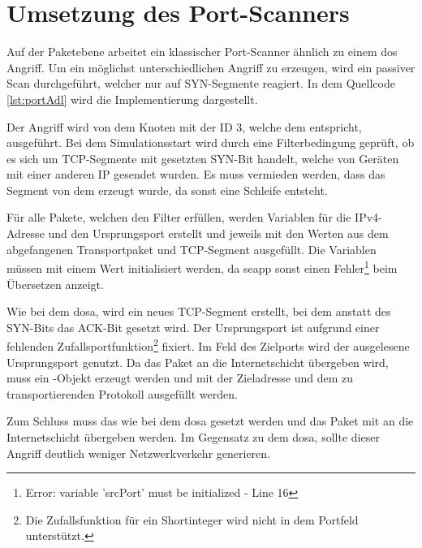 \section{Umsetzung des Port-Scanners}
\begin{program}[ht]
	}]{tucsnet/attacks/portPassive.adl}
	\caption[ACK-Scan]{Angriffsdefinition für den passiven ACK-Scan}
	\label{lst:portAdl}
\end{program}

Auf der Paketebene arbeitet ein klassischer Port-Scanner ähnlich zu einem \gls{dos} Angriff. Um ein möglichst unterschiedlichen Angriff zu erzeugen, wird ein passiver Scan durchgeführt, welcher nur auf SYN-Segmente reagiert. In dem Quellcode \ref{lst:portAdl} wird die Implementierung dargestellt. 

Der Angriff wird von dem Knoten mit der ID 3, welche dem  entspricht, ausgeführt. Bei dem Simulationsstart wird durch eine Filterbedingung geprüft, ob es sich um TCP-Segmente mit gesetzten SYN-Bit handelt, welche von Geräten mit einer anderen IP gesendet wurden. Es muss vermieden werden, dass das Segment von dem  erzeugt wurde, da sonst eine Schleife entsteht.

Für alle Pakete, welchen den Filter erfüllen, werden Variablen für die IPv4-Adresse und den Ursprungsport erstellt und jeweils mit den Werten aus dem abgefangenen Transportpaket und TCP-Segment ausgefüllt. Die Variablen müssen mit einem Wert initialisiert werden, da \gls{seapp} sonst einen Fehler\footnote{Error: variable 'srcPort' must be initialized - Line 16} beim Übersetzen anzeigt.

Wie bei dem \gls{dosa}, wird ein neues TCP-Segment erstellt, bei dem anstatt des SYN-Bits das ACK-Bit gesetzt wird. Der Ursprungsport ist aufgrund einer fehlenden Zufallsportfunktion\footnote{Die Zufallsfunktion für ein Shortinteger wird nicht in dem Portfeld unterstützt.} fixiert. Im Feld des Zielports wird der ausgelesene Ursprungsport genutzt. Da das Paket an die Internetschicht übergeben wird, muss ein -Objekt erzeugt werden und mit der Zieladresse und dem zu transportierenden Protokoll ausgefüllt werden. 

Zum Schluss muss das  wie bei dem \gls{dosa} gesetzt werden und das Paket mit  an die Internetschicht übergeben werden. Im Gegensatz zu dem \gls{dosa}, sollte dieser Angriff deutlich weniger Netzwerkverkehr generieren.

